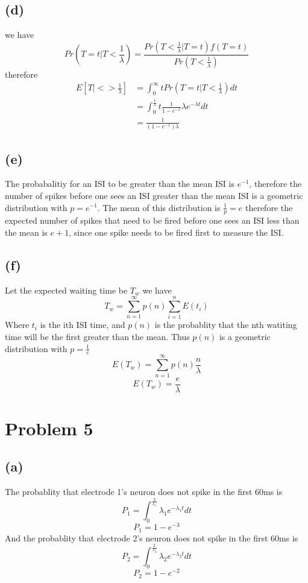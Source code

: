 \documentclass[12pt]{article}
\begin{document}
\subsection*{(d)}
we have
$$Pr\left(T=t|T<\frac{1}{\lambda}\right)=\frac{Pr(T<\frac{1}{\lambda}|T=t)f(T=t)}{Pr(T<\frac{1}{\lambda})}$$
therefore
\begin{align*}
    E[T|<>\frac{1}{\lambda}]&=\int_{0}^{\infty}tPr\left(T=t|T<\frac{1}{\lambda}\right)dt\\
    &=\int_{0}^{\frac{1}{\lambda}}t\frac{1}{1-e^{-1}} \lambda e^{-\lambda t} dt\\
    &=\boxed{\frac{1}{(1-e^{-1})\lambda}}
\end{align*}
\subsection*{(e)}
The probabalitiy for an ISI to be greater than the mean ISI is $e^{-1}$, therefore the 
number of spikes before one sees an ISI greater than the mean ISI is a geometric distribution
with $p=e^{-1}$. The mean of this distribution is $\frac{1}{p}=e$ therefore the expected number of spikes
that need to be fired before one sees an ISI less than the mean is $\boxed{e+1}$, since one spike needs to be fired first to measure the ISI.
\subsection*{(f)}
Let the expected waiting time be $T_w$ we have
$$T_w=\sum_{n=1}^\infty p(n) \sum_{i=1}^{n}E(t_i)$$
Where $t_i$ is the ith ISI time, and $p(n)$ is the probablity that the nth watiting time will be the
first greater than the mean. Thus $p(n)$ is a geometric distribution with $p=\frac{1}{e}$
$$E(T_w)=\sum_{n=1}^{\infty} p(n)\frac{n}{\lambda}$$
$$E(T_w)=\boxed{\frac{e}{\lambda}}$$
\section*{Problem 5}
\subsection*{(a)}
The probablity that electrode 1's neuron does not spike in the first 60ms is 
$$P_{1}=\int_{0}^{\frac{3}{\lambda_1}}\lambda_1 e^{-\lambda_1 t}dt$$
$$P_{1}=1-e^{-3}$$
And the probablity that electrode 2's neuron does not spike in the first 60ms is 
$$P_{2}=\int_{0}^{\frac{2}{\lambda_2}}\lambda_2 e^{-\lambda_2 t}dt$$
$$P_{2}=1-e^{-2}$$
\end{document}
